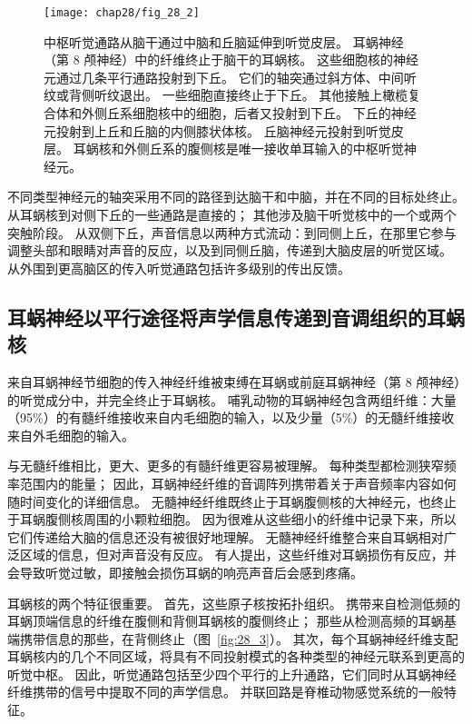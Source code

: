\begin{figure}[htbp]
	\centering
	\texttt{[image: chap28/fig\_28\_2]}
	\caption{中枢听觉通路从脑干通过中脑和丘脑延伸到听觉皮层。
		耳蜗神经（第 8 颅神经）中的纤维终止于脑干的耳蜗核。
		这些细胞核的神经元通过几条平行通路投射到下丘。
		它们的轴突通过斜方体、中间听纹或背侧听纹退出。
		一些细胞直接终止于下丘。
		其他接触上橄榄复合体和外侧丘系细胞核中的细胞，后者又投射到下丘。
		下丘的神经元投射到上丘和丘脑的内侧膝状体核。
		丘脑神经元投射到听觉皮层。
		耳蜗核和外侧丘系的腹侧核是唯一接收单耳输入的中枢听觉神经元。}
	\label{fig:28_2}
\end{figure}


不同类型神经元的轴突采用不同的路径到达脑干和中脑，并在不同的目标处终止。
从耳蜗核到对侧下丘的一些通路是直接的；
其他涉及脑干听觉核中的一个或两个突触阶段。
从双侧下丘，声音信息以两种方式流动：到同侧上丘，在那里它参与调整头部和眼睛对声音的反应，以及到同侧丘脑，传递到大脑皮层的听觉区域。
从外围到更高脑区的传入听觉通路包括许多级别的传出反馈。



\subsection{耳蜗神经以平行途径将声学信息传递到音调组织的耳蜗核}

来自耳蜗神经节细胞的传入神经纤维被束缚在耳蜗或前庭耳蜗神经（第 8 颅神经）的听觉成分中，并完全终止于耳蜗核。
哺乳动物的耳蜗神经包含两组纤维：大量（95\%）的有髓纤维接收来自内毛细胞的输入，以及少量（5\%）的无髓纤维接收来自外毛细胞的输入。


与无髓纤维相比，更大、更多的有髓纤维更容易被理解。
每种类型都检测狭窄频率范围内的能量；
因此，耳蜗神经纤维的音调阵列携带着关于声音频率内容如何随时间变化的详细信息。
无髓神经纤维既终止于耳蜗腹侧核的大神经元，也终止于耳蜗腹侧核周围的小颗粒细胞。
因为很难从这些细小的纤维中记录下来，所以它们传递给大脑的信息还没有被很好地理解。
无髓神经纤维整合来自耳蜗相对广泛区域的信息，但对声音没有反应。
有人提出，这些纤维对耳蜗损伤有反应，并会导致听觉过敏，即接触会损伤耳蜗的响亮声音后会感到疼痛。


耳蜗核的两个特征很重要。
首先，这些原子核按拓扑组织。
携带来自检测低频的耳蜗顶端信息的纤维在腹侧和背侧耳蜗核的腹侧终止； 
那些从检测高频的耳蜗基端携带信息的那些，在背侧终止（图~\ref{fig:28_3}）。 
其次，每个耳蜗神经纤维支配耳蜗核内的几个不同区域，将具有不同投射模式的各种类型的神经元联系到更高的听觉中枢。
因此，听觉通路包括至少四个平行的上升通路，它们同时从耳蜗神经纤维携带的信号中提取不同的声学信息。
并联回路是脊椎动物感觉系统的一般特征。


